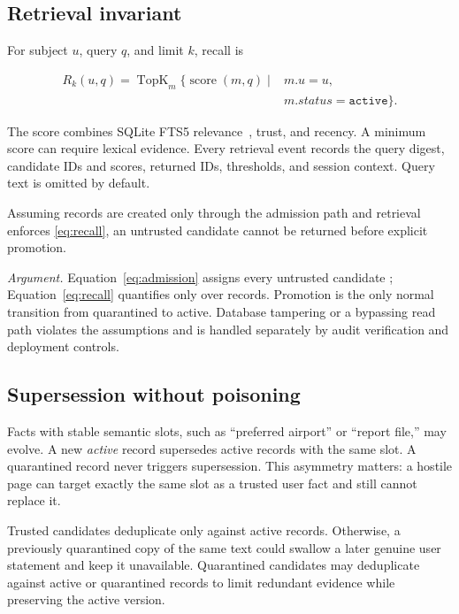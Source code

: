 \subsection{Retrieval invariant}

For subject $u$, query $q$, and limit $k$, recall is

\begin{equation}
\begin{aligned}
R_k(u,q)=\operatorname{TopK}_{m}\{\operatorname{score}(m,q) \mid{}&
m.u=u,\\[-2pt]
&m.status=\texttt{active}\}.
\end{aligned}
\label{eq:recall}
\end{equation}

The score combines SQLite FTS5 relevance~\cite{sqlitefts5}, trust, and recency. A minimum score can require lexical evidence. Every retrieval event records the query digest, candidate IDs and scores, returned IDs, thresholds, and session context. Query text is omitted by default.

 Assuming records are created only through the admission path and retrieval enforces \cref{eq:recall}, an untrusted candidate cannot be returned before explicit promotion.

\emph{Argument.} Equation~\eqref{eq:admission} assigns every untrusted candidate ; Equation~\eqref{eq:recall} quantifies only over  records. Promotion is the only normal transition from quarantined to active. Database tampering or a bypassing read path violates the assumptions and is handled separately by audit verification and deployment controls.

\subsection{Supersession without poisoning}

Facts with stable semantic slots, such as ``preferred airport'' or ``report file,'' may evolve. A new \emph{active} record supersedes active records with the same slot. A quarantined record never triggers supersession. This asymmetry matters: a hostile page can target exactly the same slot as a trusted user fact and still cannot replace it.

Trusted candidates deduplicate only against active records. Otherwise, a previously quarantined copy of the same text could swallow a later genuine user statement and keep it unavailable. Quarantined candidates may deduplicate against active or quarantined records to limit redundant evidence while preserving the active version.

